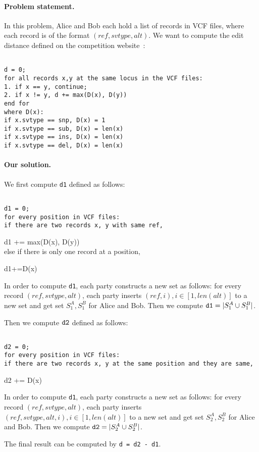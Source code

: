 \paragraph{Problem statement.}
In this problem, 
Alice and Bob each hold a list of records in VCF files, where each record is of the format $(ref, svtype, alt)$.
We want to compute the edit distance defined on the competition website~\cite{idash}:
\begin{framed}
{\tt~\\
d = 0;\\
for all records x,y at the same locus in the VCF files:\\
1. if x == y, continue;\\
2. if x != y, d += max(D(x), D(y))\\
end for\\
where D(x):\\
if x.svtype == snp, D(x) = 1\\
if x.svtype == sub, D(x) = len(x)\\
if x.svtype == ins, D(x) = len(x)\\
if x.svtype == del, D(x) = len(x)\\
}\end{framed}

\paragraph{Our solution.}
We first compute {\tt d1} defined as follows:
\begin{framed}
{\tt~\\
d1 = 0;\\
for every position in VCF files:\\
if there are two records x, y with same ref,

d1 += max(D(x), D(y))\\
else if there is only one record at a position,

d1+=D(x)\\}
\end{framed}

In order to compute {\tt d1}, each party constructs a new set as follows:  for every record $(ref, svtype, alt)$,
each party inserts $(ref, i), i\in[1, len(alt)]$ to a new set and get set $S_1^A, S_1^B$ for Alice and Bob. Then we compute
${\tt d1} = |S_1^A\cup S_1^B|$.

Then we compute ${\tt d2}$ defined as follows:
\begin{framed}
{\tt~\\
d2 = 0;\\
for every position in VCF files:\\
if there are two records x, y at the same position and they are same,

d2 += D(x)\\}
\end{framed}
In order to compute {\tt d1}, each party constructs a new set as follows:  for every record $(ref, svtype, alt)$,
each party inserts $(ref,svtype, alt, i), i\in[1, len(alt)]$ to a new set and get set $S_2^A, S_2^B$ for Alice and Bob. Then we compute
${\tt d2} = |S_2^A\cup S_2^B|$.


The final result can be computed by {\tt d = d2 - d1}.
